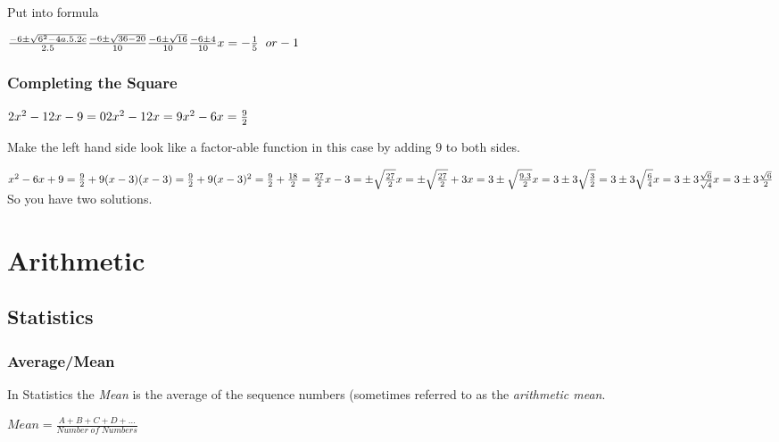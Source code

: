 \documentclass{article}
\begin{document}
Put into formula

$\frac{-6 \pm \sqrt{6^{2}-4a.5.2c}}{2.5}\\
\frac{-6 \pm \sqrt{36-20}}{10}\\
\frac{-6 \pm \sqrt{16}}{10} \\
\frac{-6 \pm 4}{10} \\
x = -\frac{1}{5}\;\; or -1\\$


\subsubsection{Completing the Square}
$2x^{2} - 12x - 9 = 0\\
2x^{2} - 12x = 9 \\
x^{2} -6x = \frac{9}{2}$

Make the left hand side look like a factor-able function in this case by adding $9$ to both sides.

$x^{2} -6x  + 9 = \frac{9}{2} + 9\\
(x-3) (x -3) = \frac{9}{2} + 9\\ 
(x-3)^{2} = \frac{9}{2} + \frac{18}{2} = \frac{27}{2}\\
x-3 = \pm \sqrt{\frac{27}{2}} \\
x = \pm \sqrt{\frac{27}{2}} + 3 \\
x = 3 \pm \sqrt{\frac{9 . 3}{2}} \\
x = 3 \pm 3\sqrt{\frac{3}{2}} = 3 \pm 3\sqrt{\frac{6}{4}} \\ 
x = 3 \pm 3\frac{\sqrt{6}}{\sqrt{4}} \\ 
x = 3 \pm 3\frac{\sqrt{6}}{2} $ So you have two solutions.

\newpage
\section{Arithmetic}
\subsection{Statistics}

\subsubsection{Average/Mean}
In Statistics the \textit{Mean} is the average of the sequence numbers (sometimes referred to as the \textit{arithmetic mean}.

$
Mean = \frac{A + B + C + D + ...}{Number\; of\; Numbers}
$
\end{document}

